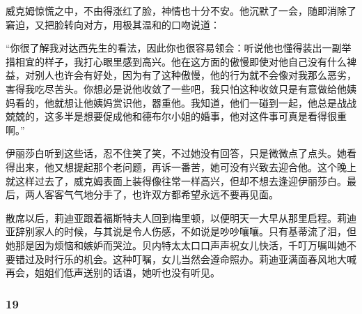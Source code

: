 \par 威克姆惊慌之中，不由得涨红了脸，神情也十分不安。他沉默了一会，随即消除了窘迫，又把脸转向对方，用极其温和的口吻说道：
\par “你很了解我对达西先生的看法，因此你也很容易领会：听说他也懂得装出一副举措相宜的样子，我打心眼里感到高兴。他在这方面的傲慢即使对他自己没有什么裨益，对别人也许会有好处，因为有了这种傲慢，他的行为就不会像对我那么恶劣，害得我吃尽苦头。你想必是说他收敛了一些吧，我只怕这种收敛只是有意做给他姨妈看的，他就想让他姨妈赏识他，器重他。我知道，他们一碰到一起，他总是战战兢兢的，这多半是想要促成他和德布尔小姐的婚事，他对这件事可真是看得很重啊。”
\par 伊丽莎白听到这些话，忍不住笑了笑，不过她没有回答，只是微微点了点头。她看得出来，他又想提起那个老问题，再诉一番苦，她可没有兴致去迎合他。这个晚上就这样过去了，威克姆表面上装得像往常一样高兴，但却不想去逢迎伊丽莎白。最后，两人客客气气地分手了，也许双方都希望永远不要再见面。
\par 散席以后，莉迪亚跟着福斯特夫人回到梅里顿，以便明天一大早从那里启程。莉迪亚辞别家人的时候，与其说是令人伤感，不如说是吵吵嚷嚷。只有基蒂流了泪，但她那是因为烦恼和嫉妒而哭泣。贝内特太太口口声声祝女儿快活，千叮万嘱叫她不要错过及时行乐的机会。这种叮嘱，女儿当然会遵命照办。莉迪亚满面春风地大喊再会，姐姐们低声送别的话语，她听也没有听见。



\subsubsection*{19}


